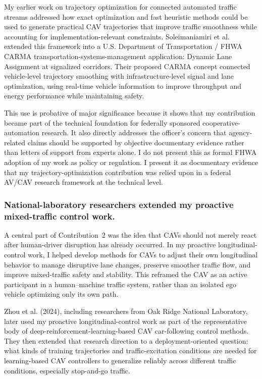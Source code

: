 \documentclass[11pt,letterpaper]{article}
\begin{document}
My earlier work on trajectory optimization for connected automated traffic streams addressed how exact optimization and fast heuristic methods could be used to generate practical CAV trajectories that improve traffic smoothness while accounting for implementation-relevant constraints. Soleimaniamiri et al. extended this framework into a U.S. Department of Transportation / FHWA CARMA transportation-systems-management application: Dynamic Lane Assignment at signalized corridors. Their proposed CARMA concept connected vehicle-level trajectory smoothing with infrastructure-level signal and lane optimization, using real-time vehicle information to improve throughput and energy performance while maintaining safety.

This use is probative of major significance because it shows that my contribution became part of the technical foundation for federally sponsored cooperative-automation research. It also directly addresses the officer's concern that agency-related claims should be supported by objective documentary evidence rather than letters of support from experts alone. I do not present this as formal FHWA adoption of my work as policy or regulation. I present it as documentary evidence that my trajectory-optimization contribution was relied upon in a federal AV/CAV research framework at the technical level.

\subsubsection{National-laboratory researchers extended my proactive mixed-traffic control work.}

A central part of Contribution~2 was the idea that CAVs should not merely react after human-driver disruption has already occurred. In my proactive longitudinal-control work, I helped develop methods for CAVs to adjust their own longitudinal behavior to manage disruptive lane changes, preserve smoother traffic flow, and improve mixed-traffic safety and stability. This reframed the CAV as an active participant in a human--machine traffic system, rather than an isolated ego vehicle optimizing only its own path.

Zhou et al. (2024), including researchers from Oak Ridge National Laboratory, later used my proactive longitudinal-control work as part of the representative body of deep-reinforcement-learning-based CAV car-following control methods. They then extended that research direction to a deployment-oriented question: what kinds of training trajectories and traffic-excitation conditions are needed for learning-based CAV controllers to generalize reliably across different traffic conditions, especially stop-and-go traffic.
\end{document}

